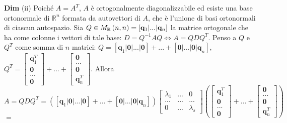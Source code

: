 \documentclass{article}
\begin{document}
\textbf{Dim} (ii) Poich\'{e} $A=A^{T}$, $A$ \`{e} ortogonalmente
diagonalizzabile ed esiste una base ortonormale di $%
\mathbb{R}
^{n}$ formata da autovettori di $A$, che \`{e} l'unione di basi ortonormali
di ciascun autospazio. Sia $Q\in M_{%
\mathbb{R}
}\left( n,n\right) =\left[ \mathbf{q}_{1}|...|\mathbf{q}_{n}\right] $ la
matrice ortogonale che ha come colonne i vettori di tale base: $%
D=Q^{-1}AQ\Longleftrightarrow A=QDQ^{T}$. Penso a $Q$ e $Q^{T}$ come somma
di $n$ matrici: $Q=\left[ \mathbf{q}_{1}\mathbf{|0|...|0}\right] +...+\left[ 
\mathbf{0|...|0|q}_{n}\right] $, $Q^{T}=\left[ 
\begin{array}{c}
\mathbf{q}_{1}^{T} \\ 
\mathbf{0} \\ 
\mathbf{...} \\ 
\mathbf{0}%
\end{array}%
\right] +...+\left[ 
\begin{array}{c}
\mathbf{0} \\ 
\mathbf{...} \\ 
\mathbf{0} \\ 
\mathbf{q}_{n}^{T}%
\end{array}%
\right] $. Allora $A=QDQ^{T}=\left( \left[ \mathbf{q}_{1}\mathbf{|0|...|0}%
\right] +...+\left[ \mathbf{0|...|0|q}_{n}\right] \right) \left[ 
\begin{array}{ccc}
\lambda _{1} & ... & 0 \\ 
... & ... & ... \\ 
0 & ... & \lambda _{s}%
\end{array}%
\right] \left( \left[ 
\begin{array}{c}
\mathbf{q}_{1}^{T} \\ 
\mathbf{0} \\ 
\mathbf{...} \\ 
\mathbf{0}%
\end{array}%
\right] +...+\left[ 
\begin{array}{c}
\mathbf{0} \\ 
\mathbf{...} \\ 
\mathbf{0} \\ 
\mathbf{q}_{n}^{T}%
\end{array}%
\right] \right) $ $=$ 
\end{document}

